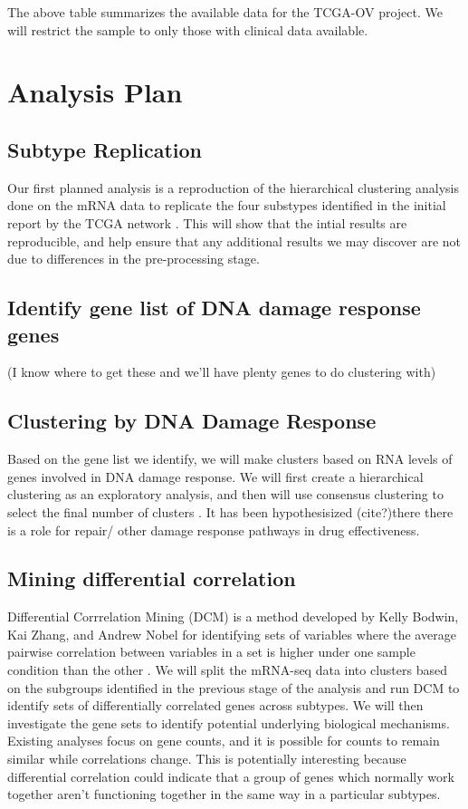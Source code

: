 \documentclass{article}
\begin{document}
The above table summarizes the available data for the TCGA-OV project. We will restrict the sample to only those with clinical data available. 

\section{Analysis Plan}

\subsection{Subtype Replication}
   Our first planned analysis is a reproduction of the hierarchical clustering analysis\cite{eisen_cluster_1998} done on the mRNA data to replicate the four substypes identified in the initial report by the TCGA network \cite{cancer2011integrated}. This will show that the intial results are reproducible, and help ensure that any additional results we may discover are not due to differences in the pre-processing stage. 
   
\subsection{Identify gene list of DNA damage response genes}
(I know where to get these and we'll have plenty genes to do clustering with)

\subsection{Clustering by DNA Damage Response}
  Based on the gene list we identify, we will make clusters based on RNA levels of genes involved in DNA damage response. We will first create a hierarchical clustering as an exploratory analysis, and then will use consensus clustering to select the final number of clusters \cite{monti_consensus_2003}. It has been hypothesisized (cite?)there there is a role for repair/ other damage response pathways in drug effectiveness. 

\subsection{Mining differential correlation} 
Differential Corrrelation Mining (DCM) is a method developed by Kelly Bodwin, Kai Zhang, and Andrew Nobel for identifying sets of variables where the average pairwise correlation between variables in a set is higher under one sample condition than the other \cite{difcor2016} . We will split the mRNA-seq data into clusters based on the subgroups identified in the previous stage of the analysis and run DCM to identify sets of differentially correlated genes across subtypes. We will then investigate the gene sets to identify potential underlying biological mechanisms. Existing analyses focus on gene counts, and it is possible for counts to remain similar while correlations change. This is potentially interesting because differential correlation could indicate that a group of genes which normally work together aren't functioning together in the same way in a particular subtypes. 
\end{document}
